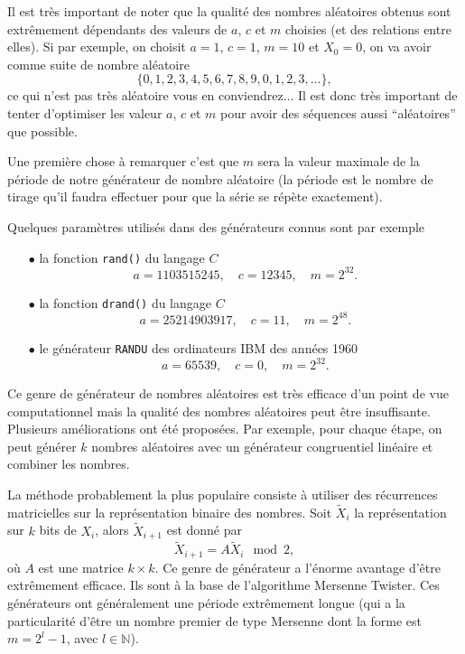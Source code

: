 \documentclass[a4paper,12pt]{book}
\renewcommand{\natural}{\mathbb{N}}
\begin{document}
Il est très important de noter que la qualité des nombres aléatoires obtenus
sont extrêmement dépendants des valeurs de $a$, $c$ et $m$ choisies (et des 
relations entre elles). Si par exemple, on choisit 
$a=1$, $c=1$, $m=10$ et $X_0=0$, on va avoir comme suite de nombre aléatoire
\begin{equation}
 \{0,1,2,3,4,5,6,7,8,9,0,1,2,3,...\},
\end{equation}
ce qui n'est pas très aléatoire vous en conviendrez... Il est donc très important
de tenter d'optimiser les valeur $a$, $c$ et $m$ pour
avoir des séquences aussi ``aléatoires'' que possible.

Une première chose à remarquer c'est que $m$ sera la valeur maximale de la période
de notre générateur de nombre aléatoire (la période est le nombre de tirage qu'il faudra
effectuer pour que la série se répète exactement).

Quelques paramètres utilisés dans des générateurs connus sont par exemple
\begin{itemize}
 \item[$\bullet$] la fonction \texttt{rand()} du langage $C$ 
 \begin{equation*}
  a=1103515245,\quad c=12345,\quad m=2^{32}.
 \end{equation*}
 \item[$\bullet$] la fonction \texttt{drand()} du langage $C$ 
 \begin{equation*}
  a=25214903917,\quad c=11,\quad m=2^{48}.
 \end{equation*}
 \item[$\bullet$] le générateur \texttt{RANDU} des ordinateurs IBM des années 1960
 \begin{equation*}
  a=65539,\quad c=0,\quad m=2^{32}.
 \end{equation*}
\end{itemize}

Ce genre de générateur de nombres aléatoires est très efficace d'un point de vue computationnel
mais la qualité des nombres aléatoires peut être insuffisante. Plusieurs améliorations
ont été proposées. Par exemple, pour chaque étape, on peut générer $k$ nombres aléatoires
avec un générateur congruentiel linéaire et combiner les nombres.

La méthode probablement la plus populaire consiste à utiliser 
des récurrences matricielles sur la représentation binaire des nombres.
Soit $\tilde X_i$ la représentation sur $k$ bits de $X_i$, alors 
$\tilde X_{i+1}$ est donné par
\begin{equation}
 \tilde X_{i+1}=A \tilde X_i \mod 2,
\end{equation}
où $A$ est une matrice $k\times k$. Ce genre de générateur a l'énorme
avantage d'être extrêmement efficace. Ils sont à la base de l'algorithme Mersenne Twister.
Ces générateurs ont généralement une période extrêmement longue (qui a la particularité d'être
un nombre premier de type Mersenne dont la forme est $m=2^l-1$, avec $l\in\natural$).
\end{document}
